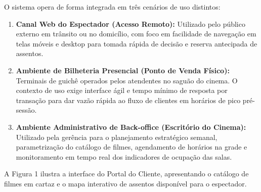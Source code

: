 
O sistema opera de forma integrada em três cenários de uso distintos:

\begin{enumerate}
\tightlist
\item \textbf{Canal Web do Espectador (Acesso Remoto):} Utilizado pelo público externo em trânsito ou no domicílio, com foco em facilidade de navegação em telas móveis e desktop para tomada rápida de decisão e reserva antecipada de assentos.
\item \textbf{Ambiente de Bilheteria Presencial (Ponto de Venda Físico):} Terminais de guichê operados pelos atendentes no saguão do cinema. O contexto de uso exige interface ágil e tempo mínimo de resposta por transação para dar vazão rápida ao fluxo de clientes em horários de pico pré-sessão.
\item \textbf{Ambiente Administrativo de Back-office (Escritório do Cinema):} Utilizado pela gerência para o planejamento estratégico semanal, parametrização do catálogo de filmes, agendamento de horários na grade e monitoramento em tempo real dos indicadores de ocupação das salas.
\end{enumerate}

A Figura 1 ilustra a interface do Portal do Cliente, apresentando o catálogo de filmes em cartaz e o mapa interativo de assentos disponível para o espectador.




